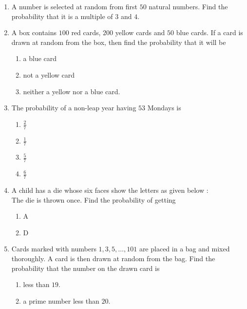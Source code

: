 \begin{enumerate}
\begin{enumerate}
\end{enumerate}
\item A number is selected at random from first $50$ natural numbers. Find the probability that it is a multiple of $3$ and $4$.\\
\item A box contains $100$ red cards, $200$ yellow cards and $50$ blue cards. If a card is drawn at random from the box, then find the probability that it will be \begin{enumerate}[label=\Roman*.]
\item a blue card
\item not a yellow card
\item neither a yellow nor a blue card.\\
\end{enumerate}
\item The probability of a non-leap year having $53$ Mondays is \\
\begin{enumerate}
\item $\frac{2}{7}$\\
\item $\frac{1}{7}$\\
\item $\frac{5}{7}$\\
\item $\frac{6}{7}$\\
\end{enumerate}
\item A child has a die whose six faces show the letters as given below :\\
The die is thrown once. Find the probability of getting\\
\begin{enumerate}[label=\Roman*.]
\item A\\
\item D\\
\end{enumerate}
\item Cards marked with numbers $1,3,5, \ldots, 101$ are placed in a bag and mixed thoroughly. A card is then drawn at random from the bag. Find the probability that the number on the drawn card is 
\begin{enumerate}[label=\Roman*.]
\item less than $19$.
\item a prime number less than $20$.\\
\end{enumerate}
\end{enumerate}
